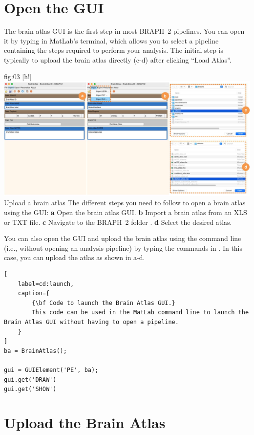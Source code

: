 \documentclass[justified]{tufte-handout}
\begin{document}
\clearpage
\section{Open the GUI}

The brain atlas GUI is the first step in most BRAPH~2 pipelines. You can open it by typing  in MatLab's terminal, which allows you to select a pipeline containing the steps required to perform your analysis. The initial step is typically to upload the brain atlas directly (c-d) after clicking ``Load Atlas''. 


	{fig:03}
	{
	[h!]
	\includegraphics{fig03.jpg}
	}
	{Upload a brain atlas}
	{
	The different steps you need to follow to open a brain atlas using the GUI: 
	{\bf a} Open the brain atlas GUI.
	{\bf b} Import a brain atlas from an XLS or TXT file.
	{\bf c} Navigate to the BRAPH~2 folder .
	{\bf d} Select the desired atlas.
	}

\begin{tcolorbox}[
	title=Brain Atlas GUI launch from command line
]
You can also open the GUI and upload the brain atlas using the command line (i.e., without opening an analysis pipeline) by typing the commands in . In this case, you can upload the atlas as shown in a-d.

\begin{lstlisting}[
	label=cd:launch,
	caption={
		{\bf Code to launch the Brain Atlas GUI.}
		This code can be used in the MatLab command line to launch the  Brain Atlas GUI without having to open a pipeline.
	}
]
ba = BrainAtlas();

gui = GUIElement('PE', ba);
gui.get('DRAW')
gui.get('SHOW')
\end{lstlisting}
\end{tcolorbox}

\clearpage
\section{Upload the Brain Atlas}
\end{document}
